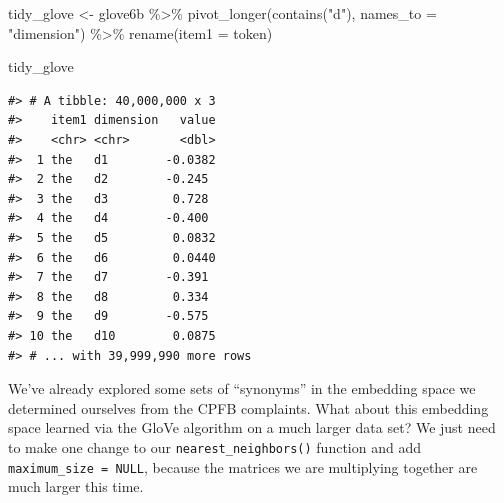 \documentclass[
]{krantz}
\makeatletter
\newenvironment{Shaded}{\begin{snugshade}}{\end{snugshade}}
\newcommand{\AttributeTok}[1]{\textcolor[rgb]{0.77,0.63,0.00}{#1}}
\newcommand{\FunctionTok}[1]{\textcolor[rgb]{0.00,0.00,0.00}{#1}}
\newcommand{\NormalTok}[1]{#1}
\newcommand{\OtherTok}[1]{\textcolor[rgb]{0.56,0.35,0.01}{#1}}
\newcommand{\SpecialCharTok}[1]{\textcolor[rgb]{0.00,0.00,0.00}{#1}}
\newcommand{\StringTok}[1]{\textcolor[rgb]{0.31,0.60,0.02}{#1}}
\newenvironment{kframe}{%
\medskip{}
\setlength{\fboxsep}{.8em}
 \def\at@end@of@kframe{}%
 \ifinner\ifhmode%
  \def\at@end@of@kframe{\end{minipage}}%
  \begin{minipage}{\columnwidth}%
 \fi\fi%
 \def\FrameCommand##1{\hskip\@totalleftmargin \hskip-\fboxsep
 \colorbox{shadecolor}{##1}\hskip-\fboxsep
     \hskip-\linewidth \hskip-\@totalleftmargin \hskip\columnwidth}%
 \MakeFramed {\advance\hsize-\width
   \@totalleftmargin\z@ \linewidth\hsize
   \@setminipage}}%
 {\par\unskip\endMakeFramed%
 \at@end@of@kframe}
\renewenvironment{Shaded}{\begin{kframe}}{\end{kframe}}
\makeatother
\begin{document}
\begin{Shaded}
\begin{Highlighting}[]
\NormalTok{tidy\_glove }\OtherTok{\textless{}{-}}\NormalTok{ glove6b }\SpecialCharTok{\%\textgreater{}\%}
  \FunctionTok{pivot\_longer}\NormalTok{(}\FunctionTok{contains}\NormalTok{(}\StringTok{"d"}\NormalTok{),}
               \AttributeTok{names\_to =} \StringTok{"dimension"}\NormalTok{) }\SpecialCharTok{\%\textgreater{}\%}
  \FunctionTok{rename}\NormalTok{(}\AttributeTok{item1 =}\NormalTok{ token)}

\NormalTok{tidy\_glove}
\end{Highlighting}
\end{Shaded}

\begin{verbatim}
#> # A tibble: 40,000,000 x 3
#>    item1 dimension   value
#>    <chr> <chr>       <dbl>
#>  1 the   d1        -0.0382
#>  2 the   d2        -0.245 
#>  3 the   d3         0.728 
#>  4 the   d4        -0.400 
#>  5 the   d5         0.0832
#>  6 the   d6         0.0440
#>  7 the   d7        -0.391 
#>  8 the   d8         0.334 
#>  9 the   d9        -0.575 
#> 10 the   d10        0.0875
#> # ... with 39,999,990 more rows
\end{verbatim}

We've already explored some sets of ``synonyms'' in the embedding space we determined ourselves from the CPFB complaints. What about this embedding space learned via the GloVe algorithm on a much larger data set? We just need to make one change to our \texttt{nearest\_neighbors()} function and add \texttt{maximum\_size\ =\ NULL}, because the matrices we are multiplying together are much larger this time.
\end{document}
